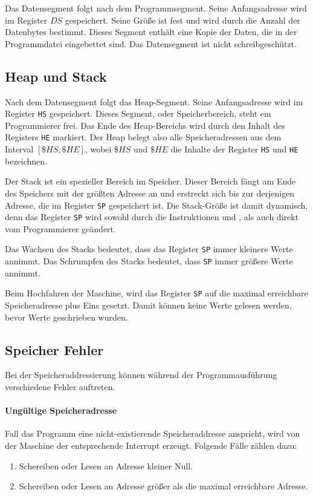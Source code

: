 Das Datensegment folgt nach dem Programmsegment. Seine
Anfangsadresse wird im Register $DS$ gespeichert. Seine
Größe ist fest und wird durch die Anzahl der Datenbytes bestimmt. Dieses Segment
enthält eine Kopie der Daten, die in der Programmdatei eingebettet sind.
Das Datensegment ist nicht schreibgeschützt.

\subsection{Heap und Stack}
\label{subsec:Stack}

Nach dem Datensegment folgt das Heap-Segment. Seine Anfangsadresse
wird im Register \texttt{HS} gespeichert. Dieses Segment,
oder Speicherbereich, steht em Programmierer frei. Das Ende des Heap-Bereichs
wird durch den Inhalt des Registers \texttt{HE} markiert.
Der Heap belegt also alle Speicheradressen aus dem Interval $[\$HS, \$HE]$,
wobei $\$HS$ und $\$HE$ die Inhalte der Register \texttt{HS} und \texttt{HE}
bezeichnen.


Der Stack ist ein spezieller Bereich im Speicher. Dieser Bereich fängt am Ende
des Speichers mit der größten Adresse an und erstreckt sich bis zur derjenigen
Adresse, die im Register \texttt{SP} gespeichert ist. Die
Stack-Größe ist damit dynamisch, denn das Register \texttt{SP} wird sowohl durch
die Instruktionen  und , als auch direkt vom
Programmierer geändert.

Das Wachsen des Stacks bedeutet, dass das Register
\texttt{SP} immer kleinere Werte annimmt. Das Schrumpfen
des Stacks bedeutet, dass \texttt{SP} immer größere Werte annimmt.

Beim Hochfahren der Maschine, wird das Register \texttt{SP} auf die
maximal erreichbare Speicheradresse plus Eins gesetzt. Damit können keine Werte
gelesen werden, bevor Werte geschrieben wurden.



\subsection{Speicher Fehler}
\label{subsec:Speicherfehler}

Bei der Speicheraddressierung können während der Programmausführung
verschiedene Fehler auftreten.

\paragraph{Ungültige Speicheradresse}
Fall das Programm eine nicht-existierende Speicheraddresse anspricht, wird von
der Maschine der entsprechende Interrupt erzeugt. Folgende Fälle zählen dazu:
\begin{enumerate}
 \item Schereiben oder Lesen an Adresse kleiner Null.
 \item Schereiben oder Lesen an Adresse größer als die maximal erreichbare
       Adresse.
\end{enumerate}


